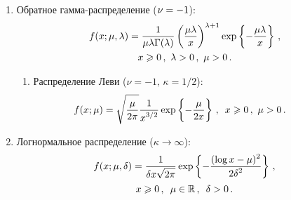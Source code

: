 \begin{multicols}{2}
\begin{enumerate}[1.]
\item Обратное гамма-распределение ($\nu\hm=-1$):
\begin{multline*}
f(x;\mu,\lambda)=\displaystyle\frac{\displaystyle 1\mathstrut}{\displaystyle \mu\lambda\Gamma(\lambda)\mathstrut}\left(\displaystyle\frac{\displaystyle \mu\lambda\mathstrut}{\displaystyle x\mathstrut}\right)^{\lambda+1}\exp
\left\{-\displaystyle\frac{\displaystyle \mu\lambda\mathstrut}{\displaystyle x\mathstrut}\right\}\,,\\
x\geqslant0\,, \ \lambda>0\,,\ \mu>0\,.
\end{multline*}
\begin{enumerate}[{4.}1.]
\item Распределение Леви ($\nu=-1,\, \kappa=1/2$):
$$%
\hspace*{-27.0681pt}f(x;\mu)=\sqrt{\fr{\mu}{2\pi}}\fr{1}{x^{3/2}}\exp\left\{-\fr{\mu}{2x}\right\}\,,\enskip
 x\geqslant0\,, \ \mu>0\,.
$$
\end{enumerate}
\item Логнормальное распределение ($\kappa\to\infty$):
\begin{multline*}
f(x;\mu,\delta)=\displaystyle\frac{\displaystyle 1\mathstrut}{\displaystyle \delta x\sqrt{2\pi}\mathstrut}\exp\left\{-\displaystyle\frac{\displaystyle (\log
x-\mu)^2\mathstrut}{\displaystyle 2\delta^2\mathstrut}\right\}\,,\\ x\geqslant0\,, \enskip \mu\in\mathbb{R}\,,\enskip
\delta>0\,.
\end{multline*}

\end{enumerate}


\end{multicols}
